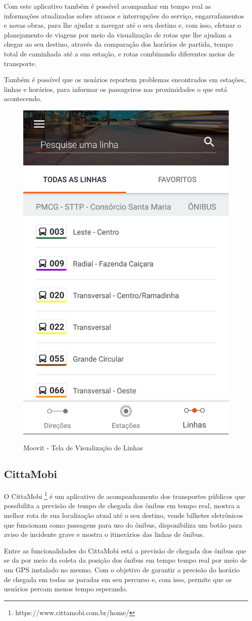 Com este aplicativo também é possível acompanhar em tempo real as informações atualizadas sobre atrasos e interrupções do serviço, engarrafamentos e novas obras, para lhe ajudar a navegar até o seu destino e, com isso, efetuar o planejamento de viagens por meio da visualização de rotas que lhe ajudam a chegar ao seu destino, através da comparação dos horários de partida, tempo total de caminhada até a sua estação, e rotas combinando diferentes meios de transporte.

Também é possível que os usuários reportem problemas encontrados em estações, linhas e horários, para informar os passageiros nas proximidades o que está acontecendo.

\begin{figure}[H]
\caption{Moovit - Tela de Visualização de Linhas}
\centering
\includegraphics[width=.4\textwidth]{imagens/moovit.png}
\label{fig:moovit}
\end{figure}

\subsection{CittaMobi}

O CittaMobi \footnote{https://www.cittamobi.com.br/home/} é um aplicativo de acompanhamento dos transportes públicos que possibilita a previsão de tempo de chegada dos ônibus em tempo real, mostra a melhor rota de sua localização atual até o seu destino, vende bilhetes eletrônicos que funcionam como passagens para uso do ônibus, disponibiliza um botão para aviso de incidente grave e mostra o itinerários das linhas de ônibus.

Entre as funcionalidades do CittaMobi está a previsão de chegada dos ônibus que se da por meio da coleta da posição dos ônibus em tempo tempo real por meio de um GPS instalado no mesmo. Com o objetivo de garantir a precisão do horário de chegada em todas as paradas em seu percurso e, com isso, permite que os usuários percam menos tempo esperando. 

